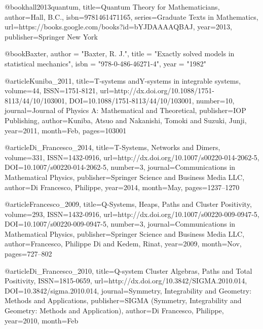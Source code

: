 @book{hall2013quantum,
	title={Quantum Theory for Mathematicians},
	author={Hall, B.C.},
	isbn={9781461471165},
	series={Graduate Texts in Mathematics},
	url={https://books.google.com/books?id=bYJDAAAAQBAJ},
	year={2013},
	publisher={Springer New York}
}

@book{Baxter,
	author = "Baxter, R. J.",
	title = "{Exactly solved models in statistical mechanics}",
	isbn = "978-0-486-46271-4",
	year = "1982"
}


@article{Kuniba_2011,
	title={T-systems andY-systems in integrable systems},
	volume={44},
	ISSN={1751-8121},
	url={http://dx.doi.org/10.1088/1751-8113/44/10/103001},
	DOI={10.1088/1751-8113/44/10/103001},
	number={10},
	journal={Journal of Physics A: Mathematical and Theoretical},
	publisher={IOP Publishing},
	author={Kuniba, Atsuo and Nakanishi, Tomoki and Suzuki, Junji},
	year={2011},
	month={Feb},
	pages={103001}
}


@article{Di_Francesco_2014,
	title={T-Systems, Networks and Dimers},
	volume={331},
	ISSN={1432-0916},
	url={http://dx.doi.org/10.1007/s00220-014-2062-5},
	DOI={10.1007/s00220-014-2062-5},
	number={3},
	journal={Communications in Mathematical Physics},
	publisher={Springer Science and Business Media LLC},
	author={Di Francesco, Philippe},
	year={2014},
	month={May},
	pages={1237–1270}
}

@article{Francesco_2009,
	title={Q-Systems, Heaps, Paths and Cluster Positivity},
	volume={293},
	ISSN={1432-0916},
	url={http://dx.doi.org/10.1007/s00220-009-0947-5},
	DOI={10.1007/s00220-009-0947-5},
	number={3},
	journal={Communications in Mathematical Physics},
	publisher={Springer Science and Business Media LLC},
	author={Francesco, Philippe Di and Kedem, Rinat},
	year={2009},
	month={Nov},
	pages={727–802}
}

@article{Di_Francesco_2010,
	title={Q-system Cluster Algebras, Paths and Total Positivity},
	ISSN={1815-0659},
	url={http://dx.doi.org/10.3842/SIGMA.2010.014},
	DOI={10.3842/sigma.2010.014},
	journal={Symmetry, Integrability and Geometry: Methods and Applications},
	publisher={SIGMA (Symmetry, Integrability and Geometry: Methods and Application)},
	author={Di Francesco, Philippe},
	year={2010},
	month={Feb}
}






